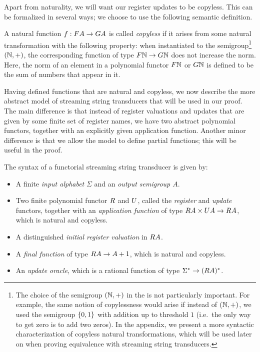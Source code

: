 Apart from naturality, we will want our register updates to be copyless. This can be formalized in several ways; we choose to use the following semantic definition.

\begin{definition} \label{def:copyless} A natural function $f : \functor A \to \functorg A$ is  called \emph{copyless} if it arises from some natural transformation with the following property:  when instantiated to the semigroup\footnote{The choice of the semigroup $({\mathbb N},+)$ in the  is not particularly important. For example, the same notion of copylessness would arise if instead of $({\mathbb N},+)$, we used the semigroup $\{0,1\}$ with addition up to threshold $1$ (i.e.~the only way to get zero is to add two zeros). In the appendix, we present a more syntactic characterization of copyless natural transformations, which will be used later on when proving equivalence with streaming string transducers. 
    } $({\mathbb N},+)$, the corresponding function of type $\functor \Nat \to \functorg \Nat$ 
    does not increase the norm. Here, the norm of an element in a polynomial functor $\functor \Nat$ or $\functorg \Nat$ is defined to be the sum of numbers that appear in it.
\end{definition}





Having defined functions that are natural and copyless, we now describe the more abstract model of  streaming string transducers that will be used in our proof. The main difference is that instead of register valuations and updates that are given by some finite set of register names, we have two abstract polynomial functors, together with an explicitly given application function. Another minor difference is that we allow the model to define partial functions; this will be useful in the proof.


\begin{definition}\label{def:functorial-sst}
    The syntax of a functorial streaming string transducer is given by:
    \begin{itemize}
        \item A finite \emph{input alphabet} $\Sigma$ and an \emph{output semigroup $A$}.
    \item Two finite polynomial functor $\functorr$ and $\functoru$, called the \emph{register} and \emph{update} functors, together with an \emph{application function} of type $\functorr A \times \functoru A \to \functorr A$, which is natural and copyless.
    \item A distinguished \emph{initial register valuation}  in $\functorr A$.
    \item A \emph{final function} of type $\functorr A \to A + 1$, which is natural and copyless.
    \item An \emph{update oracle}, which is a rational function of type $\Sigma^* \to (\functorr A)^*$.
    \end{itemize}
\end{definition}

